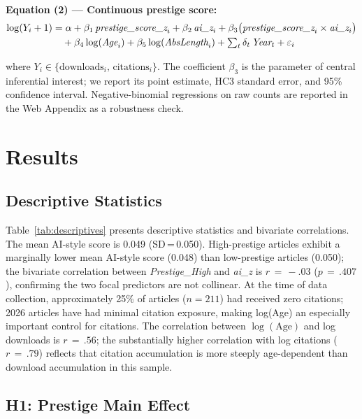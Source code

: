 \documentclass[12pt,a4paper]{article}
\begin{document}
\noindent\textbf{Equation (2) --- Continuous prestige score:}
\begin{align}
\log(Y_i+1) &= \alpha
  + \beta_1\,\textit{prestige\_score\_z}_i
  + \beta_2\,\textit{ai\_z}_i
  + \beta_3\bigl(\textit{prestige\_score\_z}_i\times\textit{ai\_z}_i\bigr)
  \notag\\
  &\quad
  + \beta_4\log(\textit{Age}_i)
  + \beta_5\log(\textit{AbsLength}_i)
  + \textstyle\sum_{t}\delta_t\,\textit{Year}_t
  + \varepsilon_i
\label{eq:score}
\end{align}

\noindent
where $Y_i\in\{\text{downloads}_i,\,\text{citations}_i\}$.
The coefficient $\beta_3$ is the parameter of central inferential
interest; we report its point estimate, HC3 standard error, and 95\%
confidence interval.
Negative-binomial regressions on raw counts are reported in the
Web Appendix as a robustness check.

\section{Results}
\label{sec:results}

\subsection{Descriptive Statistics}

Table~\ref{tab:descriptives} presents descriptive statistics and
bivariate correlations.
The mean AI-style score is 0.049 (SD\,=\,0.050).
High-prestige articles exhibit a marginally lower mean AI-style score
(0.048) than low-prestige articles (0.050); the bivariate correlation
between \textit{Prestige\_High} and \textit{ai\_z} is $r\,=\,{-}.03$
($p\,=\,.407$), confirming the two focal predictors are not collinear.
At the time of data collection, approximately 25\% of articles ($n = 211$)
had received zero citations; 2026 articles have had minimal citation
exposure, making log(Age) an especially important control for citations.
The correlation between $\log(\text{Age})$ and log downloads is
$r\,=\,.56$; the substantially higher correlation with log citations
($r\,=\,.79$) reflects that citation accumulation is more steeply
age-dependent than download accumulation in this sample.

\subsection{H1: Prestige Main Effect}
\end{document}

